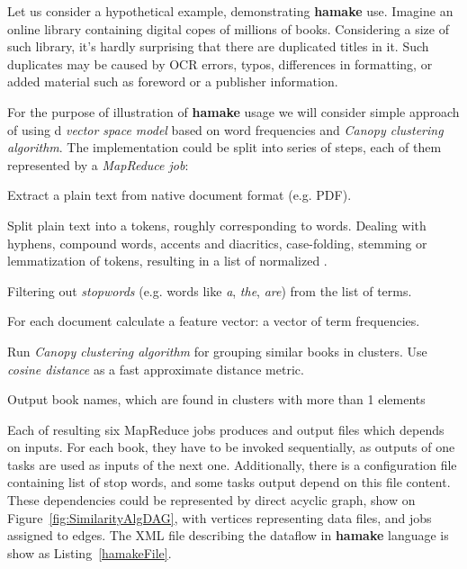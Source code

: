 \documentclass[10pt,conference,letterpaper]{IEEEtran}
\begin{document}
Let us consider a hypothetical example, demonstrating \textbf{hamake}
use. Imagine an online library containing digital copes of millions of
books. Considering a size of such library, it's hardly surprising that
there are duplicated titles in it. Such duplicates may be caused by
OCR errors, typos, differences in formatting, or added material such
as foreword or a publisher information.

For the purpose of illustration of \textbf{hamake} usage we will
consider simple approach of using d \textit{vector space
  model}\cite{manning2008introduction} based on word frequencies and
\textit{Canopy clustering algorithm}\cite{efficientClustering}. The
implementation could be split into series of steps, each of them
represented by a \textit{MapReduce job}:

\begin{description}
\item[\emph{ExtractText}] Extract a plain text from native document format
  (e.g. PDF).
\item[\emph{Tokenize}] Split plain text into a tokens, roughly
  corresponding to words. Dealing with hyphens, compound words,
  accents and diacritics, case-folding, stemming or lemmatization of
  tokens, resulting in a list of normalized .
\item[\emph{FilterStopwords}] Filtering out \textit{stopwords} (e.g. words
  like \textit{a}, \textit{the}, \textit{are}) from the list of
  terms.
\item[\emph{CalculateTF}] For each document calculate a feature
  vector: a vector of term frequencies.
\item[\emph{FindSimilar}] Run \textit{Canopy clustering algorithm}
  for grouping similar books in clusters. Use
  \textit{cosine distance} as a fast approximate distance metric. 
\item[\emph{OutputResult}] Output book names, which are found in
  clusters with more than 1 elements
\end{description}

Each of resulting six MapReduce jobs produces and output files which
depends on inputs. For each book, they have to be invoked
sequentially, as outputs of one tasks are used as inputs of the next
one. Additionally, there is a configuration file containing list of
stop words, and some tasks output depend on this file content. These
dependencies could be represented by direct acyclic graph, show on
Figure~\ref{fig:SimilarityAlgDAG}, with vertices representing data
files, and jobs assigned to edges. The XML file describing the
dataflow in \textbf{hamake} language is show as
Listing~\ref{hamakeFile}.
\end{document}
